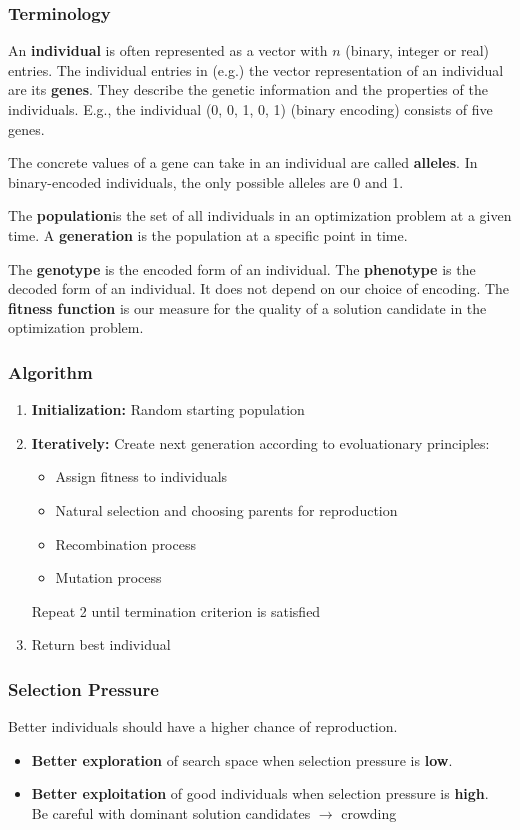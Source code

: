 \clearpage
\subsubsection{Terminology}

An \textbf{individual} is often represented as a vector with $n$ (binary, integer or
real) entries. The individual entries in (e.g.) the vector representation of an
individual are its \textbf{genes}. They describe the genetic information and the properties of the
individuals. E.g., the individual (0, 0, 1, 0, 1) (binary encoding) consists of
five genes.

The concrete values of a gene can take in an individual are
called \textbf{alleles}. In binary-encoded individuals, the only possible alleles are 0
and 1.

The \textbf{population}is the set of all individuals in an optimization
problem at a given time. A \textbf{generation} is the population at a specific point in time.

The \textbf{genotype} is the encoded form of an individual. The \textbf{phenotype} is the decoded form of an individual. It does
not depend on our choice of encoding. The \textbf{fitness function} is our measure for the quality of a
solution candidate in the optimization problem.

\subsubsection{Algorithm}

\begin{enumerate}
    \item \textbf{Initialization:} Random starting population
    \item \textbf{Iteratively:} Create next generation according to
evoluationary principles: 
\begin{itemize}
    \item Assign fitness to individuals
    \item Natural selection and choosing parents for reproduction
    \item Recombination process
    \item Mutation process
\end{itemize}
Repeat 2 until termination criterion is satisfied
\item Return best individual
\end{enumerate}

\subsubsection{Selection Pressure}
Better individuals should have a higher
chance of reproduction.
\begin{itemize}
    \item \textbf{Better exploration} of search space when selection pressure is \textbf{low}.
    \item \textbf{Better exploitation} of good individuals when selection pressure is \textbf{high}. \\
    Be careful with dominant solution candidates $\rightarrow$ crowding
\end{itemize}

